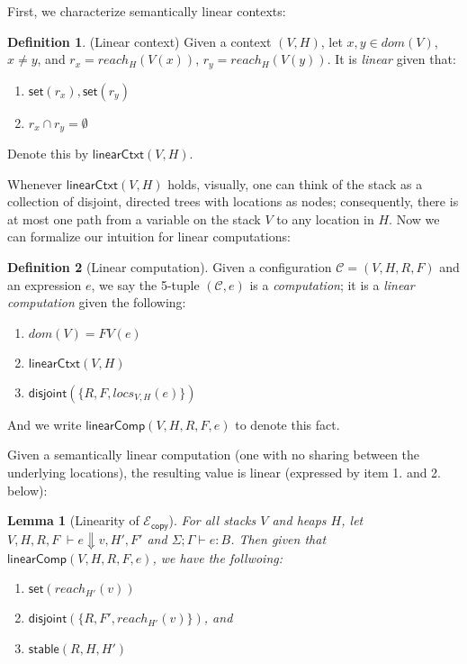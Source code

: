 \documentclass{easychair}
\newcommand{\ms}[1]{\ensuremath{\mathsf{#1}}}
\newcommand{\na}[1]{\mathsf{linearCtxt}(#1)}
\newcommand{\stable}[1]{\mathsf{stable}(#1)}
\newcommand{\dist}[1]{\mathsf{disjoint}(#1)}
\newcommand{\wfc}[5]{\mathsf{linearComp}(#1,#2,#3,#4,#5)}
\newcommand{\copySem}{\ensuremath{\mathcal{E}_{\ms{copy}}}}
\newtheorem{lemma}[theorem]{Lemma}
\theoremstyle{definition}
\newtheorem{definition}{Definition}
\begin{document}
First, we characterize semantically linear contexts: 

\begin{definition}(Linear context)
Given a context $(V,H)$, let
$x,y \in dom(V)$, $x \ne y$, and $r_x = reach_H(V(x))$, $r_y = reach_H(V(y))$.
	It is \emph{linear} given that:
\begin{enumerate}
\item $\ms{set}(r_x), \ms{set}(r_y)$
\item $r_x \cap r_y = \emptyset$
\end{enumerate}
Denote this by $\na{V,H}$.
\end{definition}

Whenever $\na{V,H}$ holds, visually, one can think of the 
stack as a collection of disjoint, directed trees with locations as nodes; 
consequently, there is at 
most one path from a variable on the stack $V$ to any location in $H$. Now we can 
formalize our intuition for linear computations: 

\begin{definition}[Linear computation]
Given a configuration $\mathcal{C} = (V,H,R,F)$ and an expression $e$, 
we say the 5-tuple $(\mathcal{C},e)$ is a \emph{computation}; it is a \emph{linear computation} 
given the following:
\begin{enumerate}
\item $dom(V) = FV(e)$
\item $\na{V,H}$
\item $\dist{\{R,F,locs_{V,H}(e)\}}$
\end{enumerate} 
And we write $\wfc{V}{H}{R}{F}{e}$ to denote this fact.
\end{definition}

Given a semantically linear computation 
(one with no sharing between the underlying locations), the resulting value is linear 
(expressed by item 1. and 2. below):
\begin{lemma}[Linearity of \copySem]
For all stacks $V$ and heaps $H$, let  $V,H,R,F \; \vdash e \Downarrow v, H', F'$ 
and $\Sigma; \Gamma \vdash e : B$. Then given that $\wfc{V}{H}{R}{F}{e}$, we have the follwoing: 
\begin{enumerate}
\item $\ms{set}(reach_{H'}(v))$
\item $\dist{\{R,F',reach_{H'}(v)\}}$, and
\item $\stable{R,H,H'}$
\end{enumerate}
\end{lemma}
\end{document}
